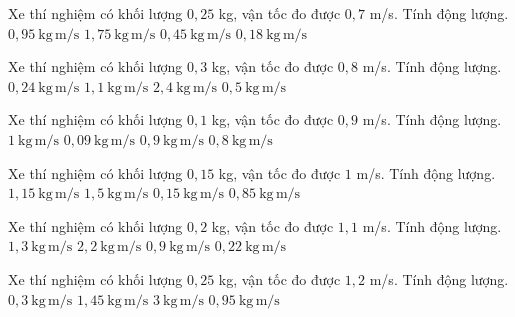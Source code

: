 \begin{ex}
Xe thí nghiệm có khối lượng $0,25$ kg, vận tốc đo được $0,7$ m/s. Tính động lượng.
\choice
{$0,95\ \mathrm{kg\,m/s}$}
{$1,75\ \mathrm{kg\,m/s}$}
{$0,45\ \mathrm{kg\,m/s}$}
{\True $0,18\ \mathrm{kg\,m/s}$}
\end{ex}

\begin{ex}
Xe thí nghiệm có khối lượng $0,3$ kg, vận tốc đo được $0,8$ m/s. Tính động lượng.
\choice
{\True $0,24\ \mathrm{kg\,m/s}$}
{$1,1\ \mathrm{kg\,m/s}$}
{$2,4\ \mathrm{kg\,m/s}$}
{$0,5\ \mathrm{kg\,m/s}$}
\end{ex}

\begin{ex}
Xe thí nghiệm có khối lượng $0,1$ kg, vận tốc đo được $0,9$ m/s. Tính động lượng.
\choice
{$1\ \mathrm{kg\,m/s}$}
{\True $0,09\ \mathrm{kg\,m/s}$}
{$0,9\ \mathrm{kg\,m/s}$}
{$0,8\ \mathrm{kg\,m/s}$}
\end{ex}

\begin{ex}
Xe thí nghiệm có khối lượng $0,15$ kg, vận tốc đo được $1$ m/s. Tính động lượng.
\choice
{$1,15\ \mathrm{kg\,m/s}$}
{$1,5\ \mathrm{kg\,m/s}$}
{\True $0,15\ \mathrm{kg\,m/s}$}
{$0,85\ \mathrm{kg\,m/s}$}
\end{ex}

\begin{ex}
Xe thí nghiệm có khối lượng $0,2$ kg, vận tốc đo được $1,1$ m/s. Tính động lượng.
\choice
{$1,3\ \mathrm{kg\,m/s}$}
{$2,2\ \mathrm{kg\,m/s}$}
{$0,9\ \mathrm{kg\,m/s}$}
{\True $0,22\ \mathrm{kg\,m/s}$}
\end{ex}

\begin{ex}
Xe thí nghiệm có khối lượng $0,25$ kg, vận tốc đo được $1,2$ m/s. Tính động lượng.
\choice
{\True $0,3\ \mathrm{kg\,m/s}$}
{$1,45\ \mathrm{kg\,m/s}$}
{$3\ \mathrm{kg\,m/s}$}
{$0,95\ \mathrm{kg\,m/s}$}
\end{ex}

